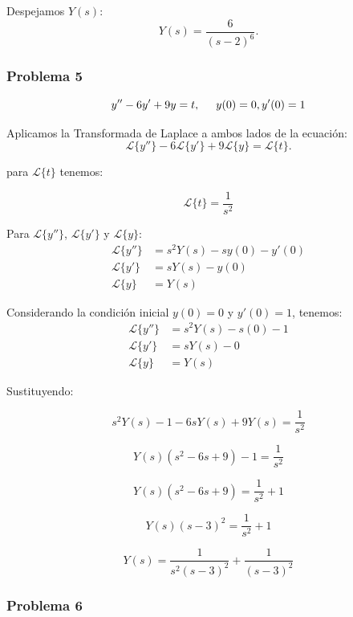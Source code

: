 \documentclass{article}
\begin{document}
Despejamos \(Y(s)\):
\begin{equation*}
    Y(s) = \frac{6}{(s-2)^6}.
\end{equation*}


\newpage


\subsubsection{Problema 5}

\[y'' - 6y' + 9y = t, \hspace{.5cm} y(0) = 0, y'(0) = 1\]

Aplicamos la Transformada de Laplace a ambos lados de la ecuación:
\[
    \mathcal{L}\{y''\} - 6\mathcal{L}\{y'\} + 9\mathcal{L}\{y\} = \mathcal{L}\{t\}.
\]

para \(\mathcal{L}\{t\}\) tenemos:

\[\mathcal{L}\{t\}=\frac{1}{s^2}\]

Para \(\mathcal{L}\{y''\}\), \(\mathcal{L}\{y'\}\) y \(\mathcal{L}\{y\}\):
\begin{align*}
    \mathcal{L}\{y''\} & = s^2Y(s) - sy(0) - y'(0) \\
    \mathcal{L}\{y'\}  & = sY(s) - y(0)            \\
    \mathcal{L}\{y\}   & = Y(s)
\end{align*}

Considerando la condición inicial $y(0) = 0$ y $y'(0) = 1$, tenemos:
\begin{align*}
    \mathcal{L}\{y''\} & = s^2Y(s) - s(0) - 1 \\
    \mathcal{L}\{y'\}  & = sY(s) - 0          \\
    \mathcal{L}\{y\}   & = Y(s)
\end{align*}

Sustituyendo:

\[
    s^2Y(s) - 1 - 6sY(s) + 9Y(s) = \frac{1}{s^2}
\]

\[
    Y(s)(s^2 -6s + 9) - 1 = \frac{1}{s^2}
\]

\[
    Y(s)(s^2 -6s + 9) = \frac{1}{s^2} + 1
\]

\[
    Y(s)(s-3)^2 = \frac{1}{s^2} + 1
\]

\[
    Y(s) = \frac{1}{s^2(s-3)^2} + \frac{1}{(s-3)^2}
\]


\newpage


\subsubsection{Problema 6}
\end{document}
